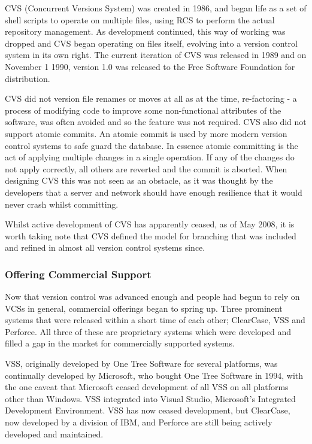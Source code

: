 CVS (Concurrent Versions System) was created in 1986, and began life as a set of shell scripts to operate on multiple files, using RCS to perform the actual repository management.
As development continued, this way of working was dropped and CVS began operating on files itself, evolving into a version control system in its own right.
The current iteration of CVS was released in 1989 and on November 1 1990, version 1.0 was released to the Free Software Foundation for distribution.

CVS did not version file renames or moves at all as at the time, re-factoring - a process of modifying code to improve some non-functional attributes of the software, was often avoided and so the feature was not required.
CVS also did not support atomic commits.
An atomic commit is used by more modern version control systems to safe guard the database.
In essence atomic committing is the act of applying multiple changes in a single operation.
If any of the changes do not apply correctly, all others are reverted and the commit is aborted.
When designing CVS this was not seen as an obstacle, as it was thought by the developers that a server and network should have enough resilience that it would never crash whilst committing.

Whilst active development of CVS has apparently ceased, as of May 2008, it is worth taking note that CVS defined the model for branching that was included and refined in almost all version control systems since.

\subsubsection{Offering Commercial Support}
Now that version control was advanced enough and people had begun to rely on VCSs in general, commercial offerings began to spring up.
Three prominent systems that were released within a short time of each other; ClearCase, VSS and Perforce.
All three of these are proprietary systems which were developed and filled a gap in the market for commercially supported systems.

VSS, originally developed by One Tree Software for several platforms, was continually developed by Microsoft, who bought One Tree Software in 1994, with the one caveat that Microsoft ceased development of all VSS on all platforms other than Windows.
VSS integrated into Visual Studio, Microsoft's Integrated Development Environment.
VSS has now ceased development, but ClearCase, now developed by a division of IBM, and Perforce are still being actively developed and maintained.


